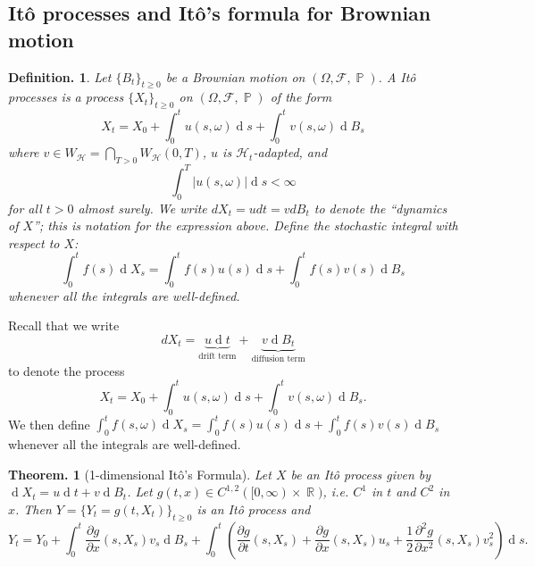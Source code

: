 \documentclass[11pt, a4paper]{memoir}
\DeclareMathOperator{\R}{{\mathbb{R}}}
\theoremstyle{change}
\newtheorem{theorem}{Theorem.}[section]
\theoremstyle{plain}
\theoremstyle{nonumberplain}
\newtheorem{definition}{Definition.}
\DeclareMathOperator{\pr}{{\mathbb{P}}}
\renewcommand{\d}[1]{\ensuremath{\operatorname{d}\!{#1}}}
\numberwithin{equation}{section}
\begin{document}
\subsection{Itô processes and Itô's formula for Brownian motion}
\begin{definition}
    Let $\{B_t\}_{t\geq 0}$ be a Brownian motion on $(\Omega,\mathcal{F},\pr)$.
    A Itô processes is a process $\{X_t\}_{t\geq 0}$ on $(\Omega,\mathcal{F},\pr)$ of the form
    \begin{equation*}
        X_t=X_0+\int_0^tu(s,\omega)\d{s}+\int_0^t v(s,\omega)\d{B_s}
    \end{equation*}
    where $v\in W_{\mathcal{H}}=\bigcap_{T>0}W_{\mathcal{H}}(0,T)$, $u$ is $\mathcal{H}_t$-adapted, and
    \begin{equation*}
        \int_0^T|u(s,\omega)|\d{s}<\infty
    \end{equation*}
    for all $t>0$ almost surely.
    We write $dX_t=udt=vdB_t$ to denote the ``dynamics of $X$''; this is notation for the expression above.
    Define the stochastic integral with respect to $X$:
    \begin{equation*}
        \int_0^tf(s)\d{X_s}=\int_0^tf(s)u(s)\d{s}+\int_0^t f(s)v(s)\d{B_s}
    \end{equation*}
    whenever all the integrals are well-defined.
\end{definition}
Recall that we write
\begin{equation*}
    dX_t=\underbrace{u\d{t}}_{\text{drift term}}+\underbrace{v\d{B_t}}_{\text{diffusion term}}
\end{equation*}
to denote the process
\begin{equation*}
    X_t=X_0+\int_0^tu(s,\omega)\d{s}+\int_0^tv(s,\omega)\d{B_s}.
\end{equation*}
We then define $\int_0^tf(s,\omega)\d{X_s}=\int_0^tf(s)u(s)\d{s}+\int_0^tf(s)v(s)\d{B_s}$ whenever all the integrals are well-defined.
\begin{theorem}[1-dimensional Itô's Formula]
    Let $X$ be an Itô process given by $\d{X_t}=u\d{t}+v\d{B_t}$.
    Let $g(t,x)\in C^{1,2}([0,\infty)\times\R)$, i.e. $C^1$ in $t$ and $C^2$ in $x$.
    Then $Y=\{Y_t=g(t,X_t)\}_{t\geq 0}$ is an Itô process and
    \begin{equation*}
        Y_t = Y_0+\int_0^t\frac{\partial g}{\partial x}(s,X_s)v_s\d{B_s}+\int_0^t\left(\frac{\partial g}{\partial t}(s,X_s)+\frac{\partial g}{\partial x}(s,X_s)u_s+\frac{1}{2}\frac{\partial^2g}{\partial x^2}(s,X_s)v_s^2\right)\d{s}.
    \end{equation*}
\end{theorem}
\end{document}
